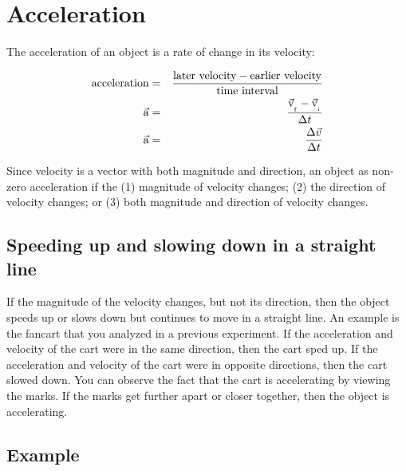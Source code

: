 
\section*{Acceleration}

The acceleration of an object is a rate of change in its velocity:

\begin{eqnarray*}
	\mbox{acceleration} & = & \frac{\mbox{later velocity} - \mbox{earlier velocity}}{\mbox{time interval}} \\
	\vec{\mathrm{a}} & = & \frac{\vec{\mathrm{v}}_{_{_{\mbox{\tiny{f}}}}} - \vec{\mathrm{v}}_{_{_{\mbox{\tiny{i}}}}}}{\Delta t} \\
	\vec{\mathrm{a}} & = & \frac{\Delta \vec{v}}{\Delta t}
\end{eqnarray*}

Since velocity is a vector with both magnitude and direction, an object as non-zero acceleration if the (1) magnitude of velocity changes; (2) the direction of velocity changes; or (3) both magnitude and direction of velocity changes.

\subsection*{Speeding up and slowing down in a straight line}

If the magnitude of the velocity changes, but not its direction, then the object speeds up or slows down but continues to move in a straight line. An example is the fancart that you analyzed in a previous experiment. If the acceleration and velocity of the cart were in the same direction, then the cart sped up. If the acceleration and velocity of the cart were in opposite directions, then the cart slowed down. You can observe the fact that the cart is accelerating by viewing the marks. If the marks get further apart or closer together, then the object is accelerating.

\subsection*{Example}

